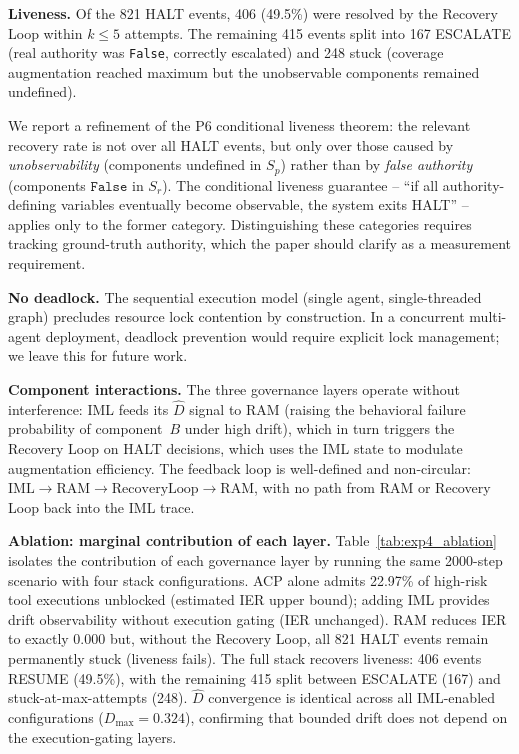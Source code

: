 \documentclass[11pt]{article}
\newcommand{\Dhat}{\widehat{D}}
\newcommand{\Sp}{S_p}
\newcommand{\Sr}{S_r}
\begin{document}
\textbf{Liveness.}
Of the 821 HALT events, 406 (49.5\%) were resolved by the Recovery Loop
within $k \leq 5$ attempts.
The remaining 415 events split into 167 ESCALATE (real authority was
\texttt{False}, correctly escalated) and 248 stuck (coverage augmentation
reached maximum but the unobservable components remained undefined).

We report a refinement of the P6 conditional liveness theorem:
the relevant recovery rate is not over all HALT events, but only over
those caused by \emph{unobservability} (components undefined in $\Sp$)
rather than by \emph{false authority} (components $\mathtt{False}$ in $\Sr$).
The conditional liveness guarantee -- ``if all authority-defining variables
eventually become observable, the system exits HALT'' -- applies
only to the former category.
Distinguishing these categories requires tracking ground-truth authority,
which the paper should clarify as a measurement requirement.

\textbf{No deadlock.}
The sequential execution model (single agent, single-threaded graph)
precludes resource lock contention by construction.
In a concurrent multi-agent deployment, deadlock prevention would require
explicit lock management; we leave this for future work.

\textbf{Component interactions.}
The three governance layers operate without interference:
IML feeds its $\Dhat$ signal to RAM (raising the behavioral failure probability
of component~$B$ under high drift), which in turn triggers the Recovery Loop
on HALT decisions, which uses the IML state to modulate augmentation
efficiency. The feedback loop is well-defined and non-circular:
$\mathrm{IML} \to \mathrm{RAM} \to \mathrm{RecoveryLoop} \to \mathrm{RAM}$,
with no path from RAM or Recovery Loop back into the IML trace.

\textbf{Ablation: marginal contribution of each layer.}
Table~\ref{tab:exp4_ablation} isolates the contribution of each governance
layer by running the same 2000-step scenario with four stack configurations.
ACP alone admits 22.97\% of high-risk tool executions unblocked (estimated
IER upper bound); adding IML provides drift observability without execution
gating (IER unchanged). RAM reduces IER to exactly 0.000 but, without the
Recovery Loop, all 821 HALT events remain permanently stuck (liveness fails).
The full stack recovers liveness: 406 events RESUME (49.5\%), with the
remaining 415 split between ESCALATE (167) and stuck-at-max-attempts (248).
$\Dhat$ convergence is identical across all IML-enabled configurations
($D_{\max} = 0.324$), confirming that bounded drift does not depend on the
execution-gating layers.
\end{document}
